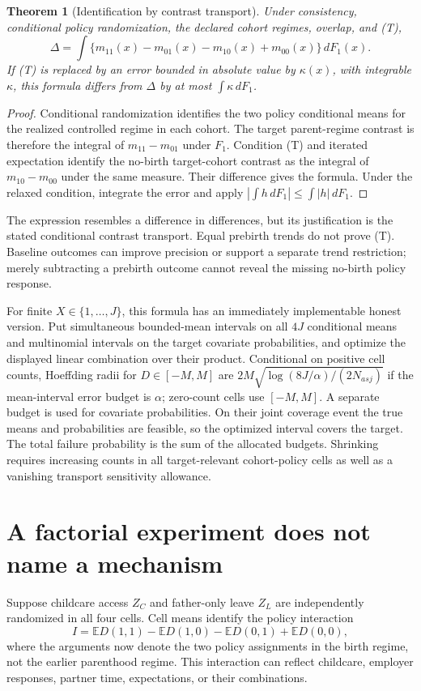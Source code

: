 \documentclass[11pt]{article}
\newtheorem{theorem}{Theorem}
\theoremstyle{remark}\newtheorem{remark}[theorem]{Remark}
\newcommand{\E}{\mathbb E}
\begin{document}
\begin{theorem}[Identification by contrast transport]\label{transport}
Under consistency, conditional policy randomization, the declared cohort regimes, overlap, and (T),
\[
 \Delta=\int\{m_{11}(x)-m_{01}(x)
                       -m_{10}(x)+m_{00}(x)\}\,dF_1(x).
\]
If (T) is replaced by an error bounded in absolute value by $\kappa(x)$, with integrable $\kappa$, this formula differs from $\Delta$ by at most $\int\kappa\,dF_1$.
\end{theorem}
\begin{proof}
Conditional randomization identifies the two policy conditional means for the realized controlled regime in each cohort. The target parent-regime contrast is therefore the integral of $m_{11}-m_{01}$ under $F_1$. Condition (T) and iterated expectation identify the no-birth target-cohort contrast as the integral of $m_{10}-m_{00}$ under the same measure. Their difference gives the formula. Under the relaxed condition, integrate the error and apply $|\int h\,dF_1|\leq\int|h|\,dF_1$.
\end{proof}

The expression resembles a difference in differences, but its justification is the stated conditional contrast transport. Equal prebirth trends do not prove (T). Baseline outcomes can improve precision or support a separate trend restriction; merely subtracting a prebirth outcome cannot reveal the missing no-birth policy response.

For finite $X\in\{1,\ldots,J\}$, this formula has an immediately implementable honest version. Put simultaneous bounded-mean intervals on all $4J$ conditional means and multinomial intervals on the target covariate probabilities, and optimize the displayed linear combination over their product. Conditional on positive cell counts, Hoeffding radii for $D\in[-M,M]$ are
$2M\sqrt{\log(8J/\alpha)/(2N_{asj})}$ if the mean-interval error budget is $\alpha$; zero-count cells use $[-M,M]$. A separate budget is used for covariate probabilities. On their joint coverage event the true means and probabilities are feasible, so the optimized interval covers the target. The total failure probability is the sum of the allocated budgets. Shrinking requires increasing counts in all target-relevant cohort-policy cells as well as a vanishing transport sensitivity allowance.

\section{A factorial experiment does not name a mechanism}
Suppose childcare access $Z_C$ and father-only leave $Z_L$ are independently randomized in all four cells. Cell means identify the policy interaction
\[
 I=\E D(1,1)-\E D(1,0)-\E D(0,1)+\E D(0,0),
\]
where the arguments now denote the two policy assignments in the birth regime, not the earlier parenthood regime. This interaction can reflect childcare, employer responses, partner time, expectations, or their combinations.
\end{document}
